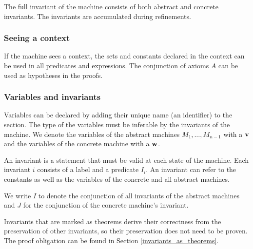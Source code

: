 The full invariant of the machine consists of both abstract and concrete invariants. 
The invariants are accumulated during refinements.


\subsubsection{Seeing a context}
\label{seeing_a_context}
If the machine sees a context, the sets and constants declared in the context can be used in
 all predicates and expressions.
The conjunction of axioms $A$ can be used as hypotheses in the proofs.

\subsubsection{Variables and invariants}
\label{variables_and_invariants}
Variables can be declared by adding their unique name (an identifier) to the  section. 
The type of the variables must be inferable by the invariants of the machine.
We denote the variables of the abstract machines $M_1,\ldots,M_{n-1}$ with a $\mathbf{v}$ and the variables of the concrete machine with a $\mathbf{w}$.

An invariant is a statement that must be valid at each state of the machine.
Each invariant $i$ consists of a label and a predicate $I_i$.
An invariant can refer to the constants as well as the variables of the concrete and all abstract machines.

We write $I$ to denote the conjunction of all invariants
of the abstract machines and $J$ for the conjunction of the concrete machine's invariant.

Invariants that are marked as theorems derive their correctness from the preservation
  of other invariants, so their preservation does not need to be proven.
The proof obligation can be found in Section \ref{invariants_as_theorems}.

